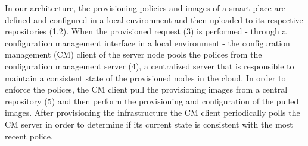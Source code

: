 In our architecture, the provisioning policies and images of a smart place are defined and configured
in a local environment and then uploaded to its respective repositories (1,2). When the provisioned request
(3) is performed - through a configuration management interface in a local environment - the configuration
management (CM) client of the server node pools the polices from the configuration management server (4),
a centralized server that is responsible to maintain a consistent state of the provisioned nodes in
the cloud. In order to enforce the polices, the CM client pull the provisioning images from a central
repository (5) and then perform the provisioning and configuration of the pulled images. After provisioning
the infrastructure the CM client periodically polls the CM server in order to determine if its current
state is consistent with the most recent police.

